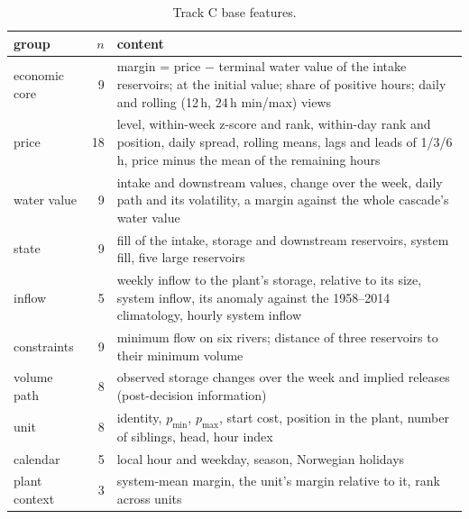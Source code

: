 \documentclass[11pt]{article}
\begin{document}
\begin{table}[H]
\centering\small
\begin{tabularx}{\linewidth}{lrY}
\toprule
group & $n$ & content \\
\midrule
economic core & 9 & margin = price $-$ terminal water value of the intake reservoirs; at the initial value; share of positive hours; daily and rolling (12\,h, 24\,h min/max) views \\
price & 18 & level, within-week z-score and rank, within-day rank and position, daily spread, rolling means, lags and leads of 1/3/6\,h, price minus the mean of the remaining hours \\
water value & 9 & intake and downstream values, change over the week, daily path and its volatility, a margin against the whole cascade's water value \\
state & 9 & fill of the intake, storage and downstream reservoirs, system fill, five large reservoirs \\
inflow & 5 & weekly inflow to the plant's storage, relative to its size, system inflow, its anomaly against the 1958--2014 climatology, hourly system inflow \\
constraints & 9 & minimum flow on six rivers; distance of three reservoirs to their minimum volume \\
volume path & 8 & observed storage changes over the week and implied releases (post-decision information) \\
unit & 8 & identity, $p_{\min}$, $p_{\max}$, start cost, position in the plant, number of siblings, head, hour index \\
calendar & 5 & local hour and weekday, season, Norwegian holidays \\
plant context & 3 & system-mean margin, the unit's margin relative to it, rank across units \\
\bottomrule
\end{tabularx}
\caption{Track C base features.}
\end{table}
\end{document}
